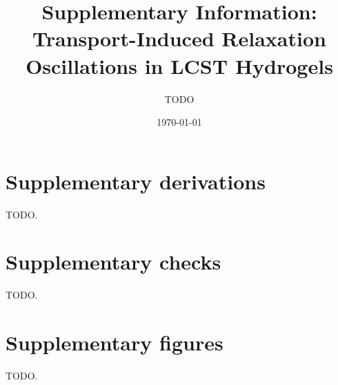 \documentclass[11pt]{article}
\title{Supplementary Information: Transport-Induced Relaxation Oscillations in LCST Hydrogels}
\author{TODO}
\date{\today}
\begin{document}
\maketitle

\section{Supplementary derivations}
TODO.

\section{Supplementary checks}
TODO.

\section{Supplementary figures}
TODO.
\end{document}
